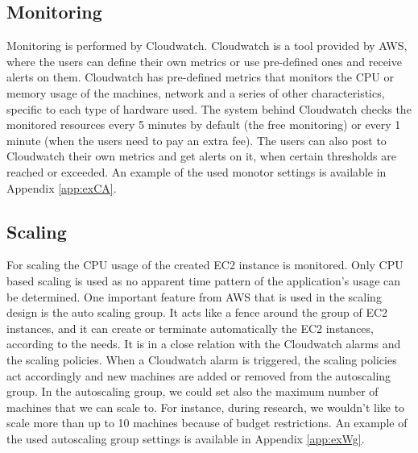 \documentclass{acm_proc_article-sp}
\begin{document}
\subsection{Monitoring}
Monitoring is performed by Cloudwatch. 
Cloudwatch is a tool provided by AWS, where the users can define their own metrics or use pre-defined ones and receive alerts on them. 
Cloudwatch has pre-defined metrics that monitors the CPU or memory usage of the machines, network and a series of other characteristics, specific to each type of hardware used. 
The system behind Cloudwatch checks the monitored resources every 5 minutes by default (the free monitoring) or every 1 minute (when the users need to pay an extra fee). 
The users can also post to Cloudwatch their own metrics and get alerts on it, when certain thresholds are reached or exceeded. 
An example of the used monotor settings is available in Appendix \ref{app:exCA}.

\subsection{Scaling}
For scaling the CPU usage of the created EC2 instance is monitored.
Only CPU based scaling is used as no apparent time pattern of the application's usage can be determined.
One important feature from AWS that is used in the scaling design is the auto scaling group. 
It acts like a fence around the group of EC2 instances, and it can create or terminate automatically the EC2 instances, according to the needs. 
It is in a close relation with the Cloudwatch alarms and the scaling policies. 
When a Cloudwatch alarm is triggered, the scaling policies act accordingly and new machines are added or removed from the autoscaling group. 
In the autoscaling group, we could set also the maximum number of machines that we can scale to.  
For instance, during research, we wouldn't like to scale more than up to 10 machines  because of budget restrictions. 
An example of the used autoscaling group settings is available in Appendix \ref{app:exWg}.
\end{document}
